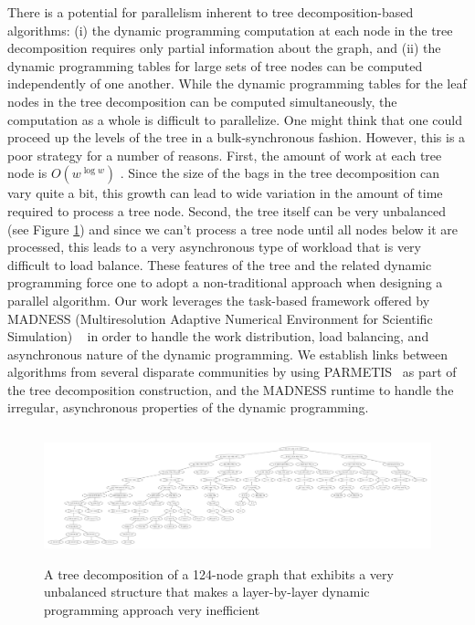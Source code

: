 \documentclass[conference]{IEEEtran}
\begin{document}
There is a potential for parallelism inherent to tree decomposition-based algorithms: (i) the dynamic programming computation at each node in the tree decomposition requires only partial information
about the graph, and (ii) the dynamic programming tables
for large sets of tree nodes can be computed independently of
one another.
While the dynamic programming tables for the leaf nodes in the tree decomposition
can be computed simultaneously, the computation as a whole is difficult to
parallelize. One might think that one could proceed up the levels of the tree in a
bulk-synchronous fashion. However, this is a poor strategy for a number of reasons.
First, the amount of work at each tree node is $O(w^{\log w})$ \cite{wilfcomplexity}.
Since the size of the bags in the tree decomposition can vary quite a bit,
this growth can lead to wide variation in the amount of time required to process a tree node.
Second, the tree itself can be very unbalanced (see Figure \ref{fig:unbalanced_tree}) and since we can't process a tree node
until all nodes below it are processed, this leads to a very asynchronous type of workload
that is very difficult to load balance.
These features of the tree and the related dynamic programming
force one to adopt a non-traditional approach when designing a parallel
algorithm.
Our work leverages the task-based framework offered
by MADNESS (Multiresolution Adaptive Numerical
Environment for Scientific Simulation) ~\cite{Thorntonintroducing} in order to handle the work distribution,
load balancing, and asynchronous nature of the dynamic
programming. We establish links between algorithms from several disparate communities by using PARMETIS~\cite{Karypis1997parmetis} as part of the tree
decomposition construction, and the MADNESS runtime to handle the irregular, asynchronous properties of the
dynamic programming.

\begin{figure}[!th]
\begin{center}
\includegraphics[height=1.5in]{figures/pr124_TD.pdf}
\caption{A tree decomposition of a 124-node graph that exhibits a very unbalanced structure that makes
a layer-by-layer dynamic programming approach very inefficient}
\label{fig:unbalanced_tree}
\end{center}
\end{figure}
\end{document}
